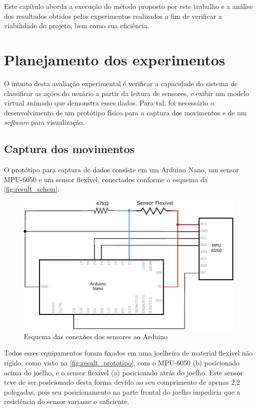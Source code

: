 Este capítulo aborda a execução do método proposto por este trabalho e a análise dos resultados obtidos pelos experimentos realizados a fim de verificar a viabilidade do projeto, bem como sua eficiência.

\section{Planejamento dos experimentos}\label{sec:result_planejamento}
O intuito desta avaliação experimental é verificar a capacidade do sistema \productname{} de classificar as ações do usuário a partir da leitura de sensores, e exibir um modelo virtual animado que demonstra esses dados. Para tal, foi necessário o desenvolvimento de um protótipo físico para a captura dos movimentos e de um \textit{software} para visualização.

\subsection{Captura dos movimentos}\label{sec:result_captura}
O protótipo para captura de dados consiste em um Arduino Nano, um sensor MPU-6050 e um sensor flexível, conectados conforme o esquema da \autoref{fig:result_schem}. 

\begin{figure}[ht]
	\caption{\label{fig:result_schem}Esquema das conexões dos sensores ao Arduino}
	\begin{center}
	    \includegraphics[width=.8\textwidth]{resources/result_schem}
	\end{center}
\end{figure}

Todos esses equipamentos foram fixados em uma joelheira de material flexível não rígido, como visto na \autoref{fig:result_prototipo}, com o MPU-6050 (b) posicionado acima do joelho, e o sensor flexível (a) posicionado atrás do joelho. Este sensor teve de ser posicionado desta forma devido ao seu comprimento de apenas 2,2 polegadas, pois seu posicionamento na parte frontal do joelho impediria que a resistência do sensor variasse o suficiente.

